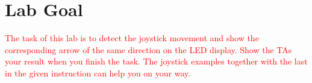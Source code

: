 \documentclass{article}
\begin{document}
\section{Lab Goal}
{\textcolor{red}{The task of this lab is to detect the joystick movement and show the corresponding arrow of the same direction on the LED display. Show the TAs your result when you finish the task. The joystick examples together with the last {} in the given instruction can help you on your way.}








}
\end{document}
